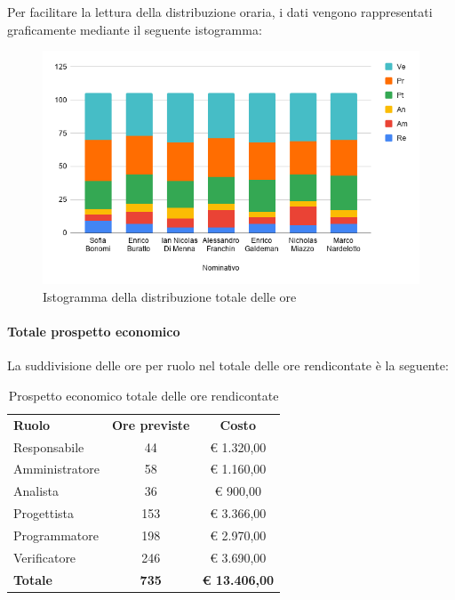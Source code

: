 \documentclass[../piano-di-progetto.tex]{subfiles}
\begin{document}
      Per facilitare la lettura della distribuzione oraria, i dati vengono rappresentati graficamente mediante il seguente istogramma:
      \begin{figure}[H]
        \centering
        \includegraphics[width=12cm]{img/ore-rendicontate.png}
        \caption{Istogramma della distribuzione totale delle ore}
        \label{fig:ore-rendicontate}
      \end{figure}
  
      \paragraph{Totale prospetto economico}
      La suddivisione delle ore per ruolo nel totale delle ore rendicontate è la seguente:
      \begin{table}[H]
        \centering
        \begin{tabular}{lcc}
          \rowcolor{lightgray}
\textbf{Ruolo}  & \textbf{Ore previste} & \textbf{Costo}       \\
Responsabile    & 44                    & € 1.320,00           \\
Amministratore  & 58                    & € 1.160,00           \\
Analista        & 36                    & € 900,00             \\
Progettista     & 153                   & € 3.366,00           \\
Programmatore   & 198                   & € 2.970,00           \\
Verificatore    & 246                   & € 3.690,00           \\
\textbf{Totale} & \textbf{735}          & \textbf{€ 13.406,00}
        \end{tabular}
        \caption{Prospetto economico totale delle ore rendicontate}
      \end{table}
  
\end{document}
